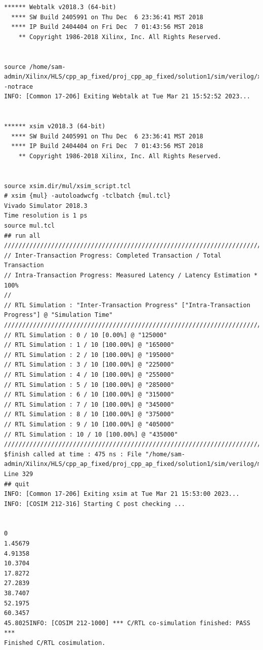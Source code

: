 \documentclass{article}
\begin{document}
\begin{lstlisting}
****** Webtalk v2018.3 (64-bit)
  **** SW Build 2405991 on Thu Dec  6 23:36:41 MST 2018
  **** IP Build 2404404 on Fri Dec  7 01:43:56 MST 2018
    ** Copyright 1986-2018 Xilinx, Inc. All Rights Reserved.


source /home/sam-admin/Xilinx/HLS/cpp_ap_fixed/proj_cpp_ap_fixed/solution1/sim/verilog/xsim.dir/mul/webtalk/xsim_webtalk.tcl -notrace
INFO: [Common 17-206] Exiting Webtalk at Tue Mar 21 15:52:52 2023...


****** xsim v2018.3 (64-bit)
  **** SW Build 2405991 on Thu Dec  6 23:36:41 MST 2018
  **** IP Build 2404404 on Fri Dec  7 01:43:56 MST 2018
    ** Copyright 1986-2018 Xilinx, Inc. All Rights Reserved.


source xsim.dir/mul/xsim_script.tcl
# xsim {mul} -autoloadwcfg -tclbatch {mul.tcl}
Vivado Simulator 2018.3
Time resolution is 1 ps
source mul.tcl
## run all
////////////////////////////////////////////////////////////////////////////////////
// Inter-Transaction Progress: Completed Transaction / Total Transaction
// Intra-Transaction Progress: Measured Latency / Latency Estimation * 100%
//
// RTL Simulation : "Inter-Transaction Progress" ["Intra-Transaction Progress"] @ "Simulation Time"
////////////////////////////////////////////////////////////////////////////////////
// RTL Simulation : 0 / 10 [0.00%] @ "125000"
// RTL Simulation : 1 / 10 [100.00%] @ "165000"
// RTL Simulation : 2 / 10 [100.00%] @ "195000"
// RTL Simulation : 3 / 10 [100.00%] @ "225000"
// RTL Simulation : 4 / 10 [100.00%] @ "255000"
// RTL Simulation : 5 / 10 [100.00%] @ "285000"
// RTL Simulation : 6 / 10 [100.00%] @ "315000"
// RTL Simulation : 7 / 10 [100.00%] @ "345000"
// RTL Simulation : 8 / 10 [100.00%] @ "375000"
// RTL Simulation : 9 / 10 [100.00%] @ "405000"
// RTL Simulation : 10 / 10 [100.00%] @ "435000"
////////////////////////////////////////////////////////////////////////////////////
$finish called at time : 475 ns : File "/home/sam-admin/Xilinx/HLS/cpp_ap_fixed/proj_cpp_ap_fixed/solution1/sim/verilog/mul.autotb.v" Line 329
## quit
INFO: [Common 17-206] Exiting xsim at Tue Mar 21 15:53:00 2023...
INFO: [COSIM 212-316] Starting C post checking ...


0
1.45679
4.91358
10.3704
17.8272
27.2839
38.7407
52.1975
60.3457
45.8025INFO: [COSIM 212-1000] *** C/RTL co-simulation finished: PASS ***
Finished C/RTL cosimulation.

\end{lstlisting}
\vspace{15cm}
\end{document}
